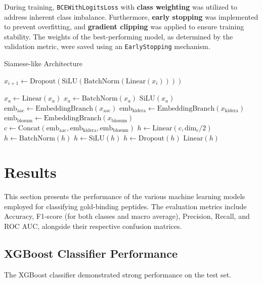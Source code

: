 \documentclass{article}
\begin{document}
During training, \texttt{BCEWithLogitsLoss} with \textbf{class weighting} was utilized to address inherent class imbalance. Furthermore, \textbf{early stopping} was implemented to prevent overfitting, and \textbf{gradient clipping} was applied to ensure training stability. The weights of the best-performing model, as determined by the validation metric, were saved using an \texttt{EarlyStopping} mechanism.

\begin{algorithm}
\caption{Siamese-like Architecture}
\begin{algorithmic}[1]
\Statex
{}
    \State $x_{i+1} \gets \text{Dropout}(\text{SiLU}(\text{BatchNorm}(\text{Linear}(x_{i}))))$
    
    \State $x_a \gets \text{Linear}(x_a)$
    \State $x_a \gets \text{BatchNorm}(x_a)$
    \State \Return $\text{SiLU}(x_a)$
\EndFunction
\Statex
{}
    \State $\text{emb}_{\text{aac}} \gets \text{EmbeddingBranch}(x_{\text{aac}})$
    \State $\text{emb}_{\text{kidera}} \gets \text{EmbeddingBranch}(x_{\text{kidera}})$
    \State $\text{emb}_{\text{blosum}} \gets \text{EmbeddingBranch}(x_{\text{blosum}})$
    \State $c \gets \text{Concat}(\text{emb}_{\text{aac}}, \text{emb}_{\text{kidera}}, \text{emb}_{\text{blosum}})$
    \State $h \gets \text{Linear}(c, \text{dim}_{c}/2)$
    \State $h \gets \text{BatchNorm}(h)$
    \State $h \gets \text{SiLU}(h)$
    \State $h \gets \text{Dropout}(h)$
    \State \Return $\text{Linear}(h)$
\EndFunction
\end{algorithmic}
\end{algorithm}

\section{Results}
This section presents the performance of the various machine learning models employed for classifying gold-binding peptides. The evaluation metrics include Accuracy, F1-score (for both classes and macro average), Precision, Recall, and ROC AUC, alongside their respective confusion matrices.

\subsection{XGBoost Classifier Performance}
The XGBoost classifier demonstrated strong performance on the test set.
\end{document}
